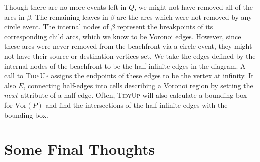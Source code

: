 \documentclass[12pt,twoside]{reedthesis}
\begin{document}
    Though there are no more events left in $Q$, we might not have removed all of the arcs in $\beta$. The remaining leaves in $\beta$ are the arcs which were not removed by any circle event. The internal nodes of $\beta$ represent the breakpoints of its corresponding child arcs, which we know to be Voronoi edges. However, since these arcs were never removed from the beachfront via a circle event, they might not have their source or destination vertices set. We take the edges defined by the internal nodes of the beachfront to be the half infinite edges in the diagram. A call to \textsc{TidyUp} assigns the endpoints of these edges to be the vertex at infinity. It also  $E$, connecting half-edges into cells describing a Voronoi region by setting the $next$ attribute of a half edge. Often, \textsc{TidyUp} will also calculate a bounding box for $\mbox{Vor}(P)$ and find the intersections of the half-infinite edges with the bounding box. 


  \clearpage

  \chapter*{Some Final Thoughts}
    \setcounter{chapter}{3}
    \setcounter{section}{0}
\end{document}
